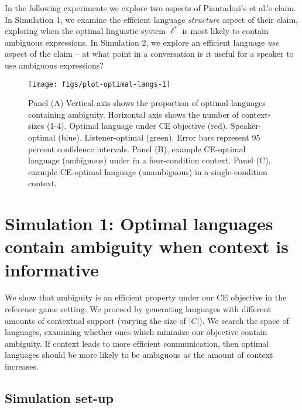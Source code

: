\documentclass[10pt, letterpaper]{article}
\newenvironment{CodeChunk}{}{}
\begin{document}
In the following experiments we explore two aspects of Piantadosi's et
al.'s claim. In Simulation 1, we examine the efficient language
\emph{structure} aspect of their claim, exploring when the optimal
linguistic system \(\ell^*\) is most likely to contain ambiguous
expressions. In Simulation 2, we explore an efficient language
\emph{use} aspect of the claim -- at what point in a conversation is it
useful for a speaker to use ambiguous expressions?\par

\begin{CodeChunk}
\begin{figure*}[h]

{\centering \texttt{[image: figs/plot-optimal-langs-1]} 

}

\caption[Panel (A) Vertical axis shows the proportion of optimal languages containing ambiguity]{Panel (A) Vertical axis shows the proportion of optimal languages containing ambiguity. Horizontal axis shows the number of context-sizes (1-4). Optimal language under CE objective (red). Speaker-optimal (blue). Listener-optimal (green). Error bars represent 95 percent confidence intervals. Panel (B), example CE-optimal language (ambiguous) under in a four-condition context. Panel (C), example CE-optimal language (unambiguous) in a single-condition context.}\label{fig:plot-optimal-langs}
\end{figure*}
\end{CodeChunk}

\section{Simulation 1: Optimal languages contain ambiguity when context
is
informative}\label{simulation-1-optimal-languages-contain-ambiguity-when-context-is-informative}

We show that ambiguity is an efficient property under our CE objective
in the reference game setting. We proceed by generating languages with
different amounts of contextual support (varying the size of \(|C|\)).
We search the space of languages, examining whether ones which minimize
our objective contain ambiguity. If context leads to more efficient
communication, then optimal languages should be more likely to be
ambiguous as the amount of context increases.\par

\subsection{Simulation set-up}\label{simulation-set-up}
\end{document}
